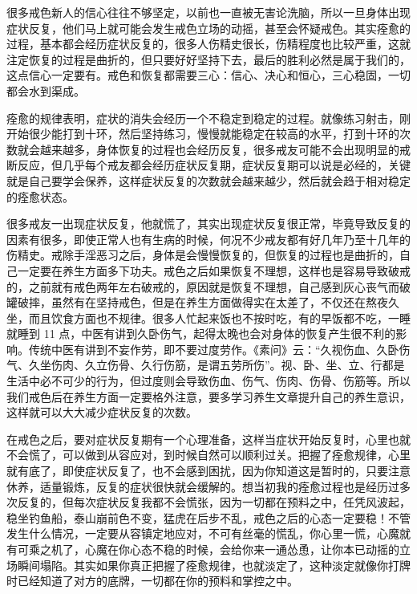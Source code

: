 \documentclass{ctexart}
\begin{document}
很多戒色新人的信心往往不够坚定，以前也一直被无害论洗脑，所以一旦身体出现症状反复，他们马上就可能会发生戒色立场的动摇，甚至会怀疑戒色。其实痊愈的过程，基本都会经历症状反复的，很多人伤精史很长，伤精程度也比较严重，这就注定恢复的过程是曲折的，但只要好好坚持下去，最后的胜利必然是属于我们的，这点信心一定要有。戒色和恢复都需要三心：信心、决心和恒心，三心稳固，一切都会水到渠成。

痊愈的规律表明，症状的消失会经历一个不稳定到稳定的过程。就像练习射击，刚开始很少能打到十环，然后坚持练习，慢慢就能稳定在较高的水平，打到十环的次数就会越来越多，身体恢复的过程也会经历反复，很多戒友可能不会出现明显的戒断反应，但几乎每个戒友都会经历症状反复期，症状反复期可以说是必经的，关键就是自己要学会保养，这样症状反复的次数就会越来越少，然后就会趋于相对稳定的痊愈状态。

很多戒友一出现症状反复，他就慌了，其实出现症状反复很正常，毕竟导致反复的因素有很多，即使正常人也有生病的时候，何况不少戒友都有好几年乃至十几年的伤精史。戒除手淫恶习之后，身体是会慢慢恢复的，但恢复的过程也是曲折的，自己一定要在养生方面多下功夫。戒色之后如果恢复不理想，这样也是容易导致破戒的，之前就有戒色两年左右破戒的，原因就是恢复不理想，自己感到灰心丧气而破罐破摔，虽然有在坚持戒色，但是在养生方面做得实在太差了，不仅还在熬夜久坐，而且饮食方面也不规律。很多人忙起来饭也不按时吃，有的早饭都不吃，一睡就睡到 11 点，中医有讲到久卧伤气，起得太晚也会对身体的恢复产生很不利的影响。传统中医有讲到不妄作劳，即不要过度劳作。《素问》云：“久视伤血、久卧伤气、久坐伤肉、久立伤骨、久行伤筋，是谓五劳所伤”。视、卧、坐、立、行都是生活中必不可少的行为，但过度则会导致伤血、伤气、伤肉、伤骨、伤筋等。所以我们戒色后在养生方面一定要格外注意，要多学习养生文章提升自己的养生意识，这样就可以大大减少症状反复的次数。

在戒色之后，要对症状反复期有一个心理准备，这样当症状开始反复时，心里也就不会慌了，可以做到从容应对，到时候自然可以顺利过关。把握了痊愈规律，心里就有底了，即使症状反复了，也不会感到困扰，因为你知道这是暂时的，只要注意休养，适量锻炼，反复的症状很快就会缓解的。想当初我的痊愈过程也是经历过多次反复的，但每次症状反复我都不会慌张，因为一切都在预料之中，任凭风波起，稳坐钓鱼船，泰山崩前色不变，猛虎在后步不乱，戒色之后的心态一定要稳！不管发生什么情况，一定要从容镇定地应对，不可有丝毫的慌乱，你心里一慌，心魔就有可乘之机了，心魔在你心态不稳的时候，会给你来一通怂恿，让你本已动摇的立场瞬间塌陷。其实如果你真正把握了痊愈规律，也就淡定了，这种淡定就像你打牌时已经知道了对方的底牌，一切都在你的预料和掌控之中。
\end{document}
